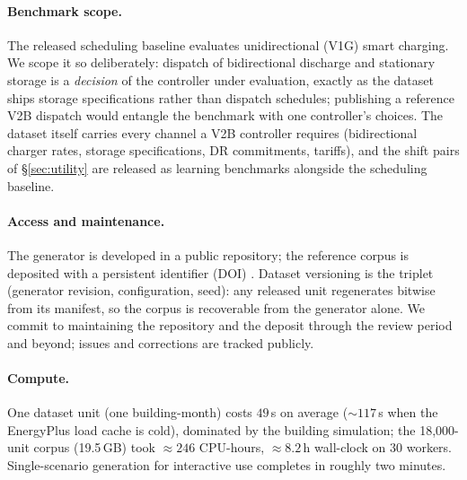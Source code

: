 \paragraph{Benchmark scope.}
The released scheduling baseline evaluates unidirectional (V1G) smart
charging. We scope it so deliberately: dispatch of bidirectional discharge
and stationary storage is a \emph{decision} of the controller under
evaluation, exactly as the dataset ships storage specifications rather than
dispatch schedules; publishing a reference V2B dispatch would entangle the
benchmark with one controller's choices. The dataset itself carries every
channel a V2B controller requires (bidirectional charger rates, storage
specifications, DR commitments, tariffs), and the shift pairs of
\S\ref{sec:utility} are released as learning benchmarks alongside the
scheduling baseline.

\paragraph{Access and maintenance.}
The generator is developed in a public repository; the reference corpus is
deposited with a persistent identifier (DOI) .
Dataset versioning is the triplet (generator revision, configuration, seed):
any released unit regenerates bitwise from its manifest, so the corpus is
recoverable from the generator alone. We commit to maintaining the repository
and the deposit through the review period and beyond; issues and corrections
are tracked publicly.

\paragraph{Compute.}
One dataset unit (one building-month) costs $49$\,s on average
(${\sim}117$\,s when the EnergyPlus load cache is cold), dominated by the
building simulation; the 18{,}000-unit corpus (19.5\,GB) took
${\approx}246$ CPU-hours, ${\approx}8.2$\,h wall-clock on 30 workers.
Single-scenario generation for interactive use completes in roughly two
minutes.
